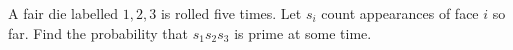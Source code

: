 A fair die labelled $1,2,3$ is rolled five times. Let $s_i$ count appearances of face $i$ so far. Find the probability that $s_1s_2s_3$ is prime at some time.
